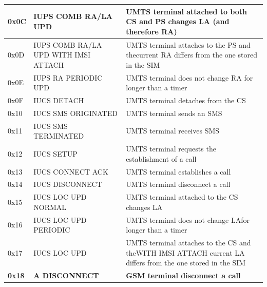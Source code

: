 \documentclass[master,english]{hgbthesis}
\begin{document}
{\begin{longtable}{|l|p{4cm}|p{8cm}|}
		0x0C         & IUPS COMB RA/LA UPD                  & UMTS terminal attached to both CS and PS changes LA (and therefore RA)                                     \\ \hline
		0x0D         & IUPS COMB RA/LA UPD WITH IMSI ATTACH & UMTS terminal attaches to the PS and thecurrent RA differs from the one stored in the SIM                  \\ \hline
		0x0E         & IUPS RA PERIODIC UPD                 & UMTS terminal does not change RA for longer than a timer                                                   \\ \hline
		0x0F         & IUCS DETACH                          & UMTS terminal detaches from the CS                                                                         \\ \hline
		0x10         & IUCS SMS ORIGINATED                  & UMTS terminal sends an SMS                                                                                 \\ \hline
		0x11         & IUCS SMS TERMINATED                  & UMTS terminal receives SMS                                                                                 \\ \hline
		0x12         & IUCS SETUP                           & UMTS terminal requests the establishment of a call                                                         \\ \hline
		0x13         & IUCS CONNECT ACK                     & UMTS terminal establishes a call                                                                           \\ \hline
		0x14         & IUCS DISCONNECT                      & UMTS terminal disconnect a call                                                                            \\ \hline
		0x15         & IUCS LOC UPD NORMAL                  & UMTS terminal attached to the CS changes LA                                                                \\ \hline
		0x16         & IUCS LOC UPD PERIODIC                & UMTS terminal does not change LAfor longer than a timer                                                    \\ \hline
		0x17         & IUCS LOC UPD                         & UMTS terminal attaches to the CS and theWITH IMSI ATTACH current LA differs from the one stored in the SIM \\ \hline
		\textbf{0x18}         & \textbf{A DISCONNECT}                         & \textbf{GSM terminal disconnect a call}                                                                             \\ \hline

\end{longtable}}
\end{document}
